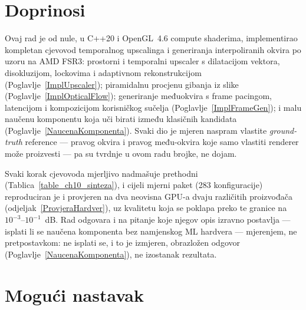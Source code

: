 \documentclass{mathos}
\begin{document}
\section{Doprinosi}

Ovaj rad je od nule, u C++20 i OpenGL~4.6 compute shaderima, implementirao
kompletan cjevovod temporalnog upscalinga i generiranja interpoliranih
okvira po uzoru na AMD FSR3: prostorni i temporalni upscaler s dilatacijom
vektora, disokluzijom, lockovima i adaptivnom rekonstrukcijom
(Poglavlje~\ref{ImplUpscaler}); piramidalnu procjenu gibanja iz slike
(Poglavlje~\ref{ImplOpticalFlow}); generiranje međuokvira s frame pacingom,
latencijom i kompozicijom korisničkog sučelja
(Poglavlje~\ref{ImplFrameGen}); i malu naučenu komponentu koja uči birati
između klasičnih kandidata (Poglavlje~\ref{NaucenaKomponenta}). Svaki dio je
mjeren naspram vlastite \emph{ground-truth} reference — pravog okvira i
pravog među-okvira koje samo vlastiti renderer može proizvesti — pa su
tvrdnje u ovom radu brojke, ne dojam.

Svaki korak cjevovoda mjerljivo nadmašuje prethodni (Tablica~\ref{table_ch10_sinteza}),
i cijeli mjerni paket (283 konfiguracije) reproduciran je i provjeren na dva
neovisna GPU-a dvaju različitih proizvođača (odjeljak~\ref{ProvjeraHardver}),
uz kvalitetu koja se poklapa preko te granice na $10^{-3}$--$10^{-1}$~dB.
Rad odgovara i na pitanje koje njegov opis izravno postavlja — isplati li se
naučena komponenta bez namjenskog ML hardvera — mjerenjem, ne pretpostavkom:
ne isplati se, i to je izmjeren, obrazložen odgovor
(Poglavlje~\ref{NaucenaKomponenta}), ne izostanak rezultata.

\section{Mogući nastavak}\label{ZakljucakNastavak}
\end{document}
